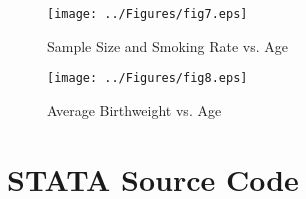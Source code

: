 \documentclass{article}
\begin{document}
\begin{enumerate}
\begin{enumerate}
\begin{figure}[htbp!]
\centering
\texttt{[image: ../Figures/fig7.eps]}
\caption{Sample Size and Smoking Rate vs. Age}
\label{fig:lifec}
\end{figure}

\begin{figure}[htbp!]
\centering
\texttt{[image: ../Figures/fig8.eps]}
\caption{Average Birthweight vs. Age}
\label{fig:birwt}
\end{figure}

\end{enumerate}
\end{enumerate}

\bigskip

\appendix

\section{STATA Source Code}
\end{document}
